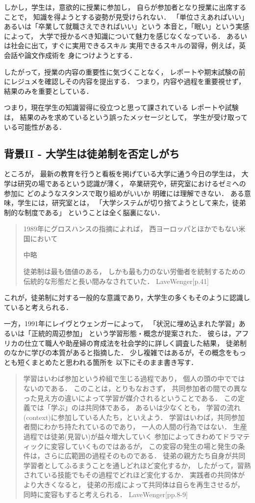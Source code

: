 \documentclass{hissymp}
\begin{document}
しかし，学生は，意欲的に授業に参加し，
自らが参加者となり授業に出席することで，
知識を得ようとする姿勢が見受けられない．
「単位さえあればいい」あるいは「卒業して就職さえできればいい」という
本音と，「眠い」という実感によって，
大学で授かるべき知識について魅力を感じなくなっている．
あるいは社会に出て，すぐに実用できるスキル
実用できるスキルの習得，例えば，英会話や論文作成術を
身につけようとする．

したがって，授業の内容の重要性に気づくことなく，
レポートや期末試験の前にレジュメを確認しその内容を提出する．
つまり，内容や過程を重要視せず，結果のみを重要としている．

つまり，現在学生の知識習得に役立つと思って課されている
レポートや試験は，
結果のみを求めているという誤ったメッセージとして，
学生が受け取っている可能性がある．

\subsection{背景II - 大学生は徒弟制を否定しがち}
\label{sec:org407e216}
ところが，
最新の教育を行うと看板を掲げている大学に通う今日の学生は，
大学は研究の場であるという認識が薄く，
卒業研究や，研究室におけるゼミへの参加に
どのようなスタンスで取り組めがいいか
明確には理解できない．
ある意味，学生には，研究室とは，
「大学システムが切り捨てようとして来た，徒弟制的な制度である」
ということは全く脳裏にない．

\begin{quote}
1989年にグロスハンスの指摘によれば，
西ヨーロッパとほかでもない米国において

中略

徒弟制は最も価値のある，
しかも最も力のない労働者を統制するための伝統的な形態だと長い間みなされていた．
LaveWenger[p.41]
\end{quote}
これが，徒弟制に対する一般的な意識であり，大学生の多くもそのように認識していると考えられる．

一方，1991年にレイヴとウェンガーによって，
  「状況に埋め込まれた学習」あるいは「正統的周辺参加」
  という学習形態・概念が提案された．
  彼らは，アフリカの仕立て職人や助産婦の育成法を社会学的に詳しく調査した結果，
  徒弟制のなかに学びの本質があると指摘した．
少し複雑ではあるが，その概念をもっとも短くまとめたと思われる箇所を
以下にそのまま書き写す．
\begin{quote}
  学習はいわば参加という枠組で生じる過程であり，
  個人の頭の中でではないのである．
  このことは，とりもなおさず，
共同参加者の間での異なった見え方の違いによって学習が媒介されるということである．
この定義では「学ぶ」のは共同体である，
あるいは少なくとも，
学習の流れ(context)に参加している人たち，といえよう．
学習はいわば，共同参加者間にわかち持たれているのであり，
一人の人間の行為ではない．
生産過程では徒弟(見習い)が益々増大していく
参加によってきわめてドラマティックに変容していくものではあるが，
この変容の発生の場と発生の条件は，さらに広範囲の過程そのものである．
徒弟の親方たち自身が共同学習者としてふるまうことを通しどれほど変化するか，
したがって，習熟されている技能でもその過程でどれほど変化するか．
実践者の共同体がより大きくなると，
徒弟の形成によって共同体は自らを再生させるが，
同時に変容もすると考えられる．
LaveWenger[pp.8-9]
\end{quote}
\end{document}
